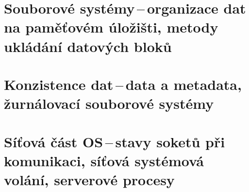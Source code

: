\newpage
\section{Souborové systémy\,--\,organizace dat na paměťovém úložišti, metody ukládání datových bloků}

\newpage
\section{Konzistence dat\,--\,data a metadata, žurnálovací souborové systémy}

\newpage
\section{Síťová část OS\,--\,stavy soketů při komunikaci, síťová systémová volání, serverové procesy}